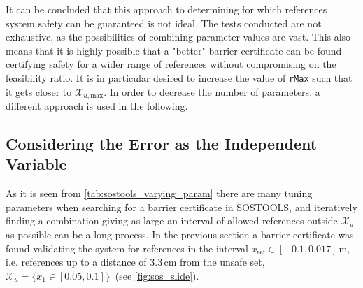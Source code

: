 %
%
%

\vspace{-2mm}
It can be concluded that this approach to determining for which references system safety can be guaranteed is not ideal. The tests conducted are not exhaustive, as the possibilities of combining parameter values are vast. This also means that it is highly possible that a "better" barrier certificate can be found certifying safety for a wider range of references without compromising on the feasibility ratio. It is in particular desired to increase the value of \texttt{rMax} such that it gets closer to $\mathcal{X}_{u,\text{max}}$.
In order to decrease the number of parameters, a different approach is used in the following.

\subsection{Considering the Error as the Independent Variable}\label{sec:sos_1storder_error}

As it is seen from \autoref{tab:sostools_varying_param} there are many tuning parameters when searching for a barrier certificate in SOSTOOLS, and iteratively finding a combination giving as large an interval of allowed references outside $\mathcal{X}_u$ as possible can be a long process. 
In the previous section a barrier certificate was found validating the system for references in the interval $x_\text{ref}\in [-0.1,0.017]$\,m, i.e. references up to a distance of 3.3\,cm from the unsafe set, $\mathcal{X}_u=\{x_1\in[0.05,0.1]\}$\, (see \autoref{fig:sos_slide}). 

